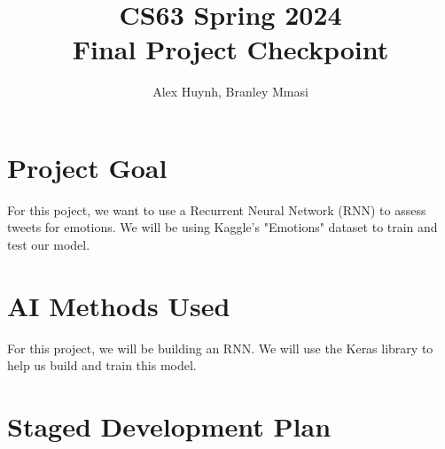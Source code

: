 \documentclass[11pt]{article}
\title{CS63 Spring 2024\\Final Project Checkpoint}
\author{Alex Huynh, Branley Mmasi}
\date{}
\begin{document}
\maketitle

\section{Project Goal}

For this poject, we want to use a Recurrent Neural Network (RNN) to assess
tweets for emotions. We will be using Kaggle's "Emotions" dataset to train
and test our model.

\section{AI Methods Used}

For this project, we will be building an RNN. We will use the Keras library
to help us build and train this model.

\section{Staged Development Plan}
\end{document}
